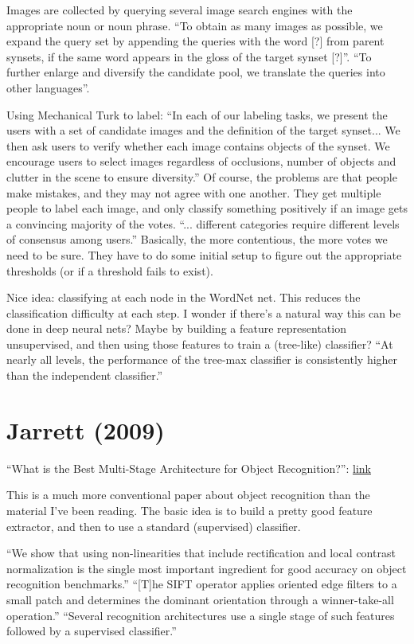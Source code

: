 \documentclass[12pt]{report}
\newcommand{\link}[2]{\href{#1}{#2}}
\begin{document}
Images are collected by querying several image search engines with the
appropriate noun or noun phrase.  ``To obtain as many images as
possible, we expand the query set by appending the queries with the
word [?] from parent synsets, if the same word appears in the gloss of
the target synset [?]''.  ``To further enlarge and diversify the
candidate pool, we translate the queries into other languages''.

Using Mechanical Turk to label: ``In each of our labeling tasks, we
present the users with a set of candidate images and the definition of
the target synset... We then ask users to verify whether each image
contains objects of the synset.  We encourage users to select images
regardless of occlusions, number of objects and clutter in the scene
to ensure diversity.''  Of course, the problems are that people make
mistakes, and they may not agree with one another.  They get multiple
people to label each image, and only classify something positively if
an image gets a convincing majority of the votes.  ``... different
categories require different levels of consensus among users.''
Basically, the more contentious, the more votes we need to be sure.
They have to do some initial setup to figure out the appropriate
thresholds (or if a threshold fails to exist).

Nice idea: classifying at each node in the WordNet net.  This reduces
the classification difficulty at each step.  I wonder if there's a
natural way this can be done in deep neural nets?  Maybe by building a
feature representation unsupervised, and then using those features to
train a (tree-like) classifier?  ``At nearly all levels, the
performance of the tree-max classifier is consistently higher than the
independent classifier.''

\section{Jarrett (2009)}

``What is the Best Multi-Stage Architecture for Object Recognition?'':
\link{http://yann.lecun.com/exdb/publis/pdf/jarrett-iccv-09.pdf}{link}

This is a much more conventional paper about object recognition than
the material I've been reading.  The basic idea is to build a pretty
good feature extractor, and then to use a standard (supervised)
classifier.

``We show that using non-linearities that include rectification and
local contrast normalization is the single most important ingredient
for good accuracy on object recognition benchmarks.''  ``[T]he SIFT
operator applies oriented edge filters to a small patch and determines
the dominant orientation through a winner-take-all operation.''
``Several recognition architectures use a single stage of such
features followed by a supervised classifier.''
\end{document}
